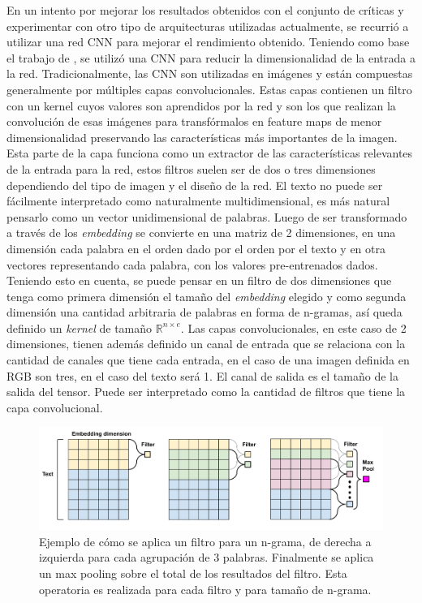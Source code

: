 \documentclass[spanish]{article}
\theoremstyle{definition}
\theoremstyle{remark}
\numberwithin{equation}{section}
\numberwithin{equation}{section} %
\begin{document}
En un intento por mejorar los resultados obtenidos con el conjunto de críticas y experimentar con otro tipo de arquitecturas utilizadas actualmente, se recurrió a utilizar una red CNN para mejorar el rendimiento obtenido. Teniendo como base el trabajo de \cite{kim2014convolutional}, se utilizó una CNN para reducir la dimensionalidad de la entrada a la red. Tradicionalmente, las CNN son utilizadas en imágenes y están compuestas generalmente por múltiples capas convolucionales. Estas capas contienen un filtro con un kernel cuyos valores son aprendidos por la red y son los que realizan la convolución de esas imágenes para transfórmalos en feature maps de menor dimensionalidad preservando las características más importantes de la imagen. Esta parte de la capa funciona como un extractor de las características relevantes de la entrada para la red, estos filtros suelen ser de dos o tres dimensiones dependiendo del tipo de imagen y el diseño de la red. El texto no puede ser fácilmente interpretado como naturalmente multidimensional, es más natural pensarlo como un vector unidimensional de palabras. Luego de ser transformado a través de los \textit{embedding} se convierte en una matriz de 2 dimensiones, en una dimensión cada palabra en el orden dado por el orden por el texto y en otra vectores representando cada palabra, con los valores pre-entrenados dados. Teniendo esto en cuenta, se puede pensar en un filtro de dos dimensiones que tenga como primera dimensión el tamaño del \textit{embedding} elegido y como segunda dimensión una cantidad arbitraria de palabras en forma de n-gramas, así queda definido un \textit{kernel} de tamaño  $\mathbb{R}^{n \times e}$. Las capas convolucionales, en este caso de 2 dimensiones, tienen además definido un canal de entrada que se relaciona con la cantidad de canales que tiene cada entrada, en el caso de una imagen definida en RGB son tres, en el caso del texto será 1. El canal de salida es el tamaño de la salida del tensor. Puede ser interpretado como la cantidad de filtros que tiene la capa convolucional. 
\par
\par
\begin{figure}[H]
\centering
\includegraphics[width=15cm]{img/Convolucion_texto.png}
\caption[Convolución texto]{\footnotesize{Ejemplo de cómo se aplica un filtro para un n-grama, de derecha a izquierda para cada agrupación de 3 palabras. Finalmente se aplica un max pooling sobre el total de los resultados del filtro. Esta operatoria es realizada para cada filtro y para tamaño de n-grama. }}
\label{fig:ConvolucionTexto}
\end{figure}
\end{document}

